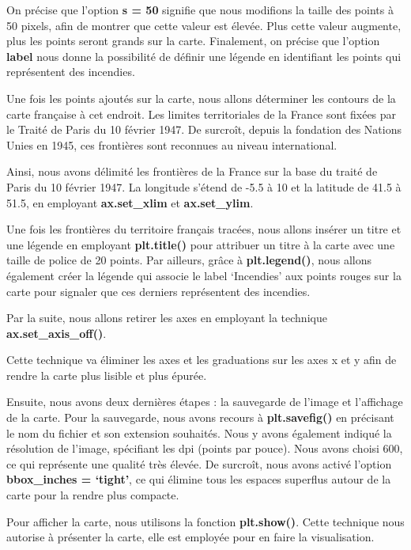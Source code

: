 \documentclass[
]{article}
\begin{document}
On précise que l'option \textbf{s = 50} signifie que nous modifions la
taille des points à 50 pixels, afin de montrer que cette valeur est
élevée. Plus cette valeur augmente, plus les points seront grands sur la
carte. Finalement, on précise que l'option \textbf{label} nous donne la
possibilité de définir une légende en identifiant les points qui
représentent des incendies.

Une fois les points ajoutés sur la carte, nous allons déterminer les
contours de la carte française à cet endroit. Les limites territoriales
de la France sont fixées par le Traité de Paris du 10 février 1947. De
surcroît, depuis la fondation des Nations Unies en 1945, ces frontières
sont reconnues au niveau international.

Ainsi, nous avons délimité les frontières de la France sur la base du
traité de Paris du 10 février 1947. La longitude s'étend de -5.5 à 10 et
la latitude de 41.5 à 51.5, en employant \textbf{ax.set\_xlim} et
\textbf{ax.set\_ylim}.

Une fois les frontières du territoire français tracées, nous allons
insérer un titre et une légende en employant \textbf{plt.title()} pour
attribuer un titre à la carte avec une taille de police de 20 points.
Par ailleurs, grâce à \textbf{plt.legend()}, nous allons également créer
la légende qui associe le label `Incendies' aux points rouges sur la
carte pour signaler que ces derniers représentent des incendies.

Par la suite, nous allons retirer les axes en employant la technique
\textbf{ax.set\_axis\_off()}.

Cette technique va éliminer les axes et les graduations sur les axes x
et y afin de rendre la carte plus lisible et plus épurée.

Ensuite, nous avons deux dernières étapes : la sauvegarde de l'image et
l'affichage de la carte. Pour la sauvegarde, nous avons recours à
\textbf{plt.savefig()} en précisant le nom du fichier et son extension
souhaités. Nous y avons également indiqué la résolution de l'image,
spécifiant les dpi (points par pouce). Nous avons choisi 600, ce qui
représente une qualité très élevée. De surcroît, nous avons activé
l'option \textbf{bbox\_inches = `tight'}, ce qui élimine tous les
espaces superflus autour de la carte pour la rendre plus compacte.

Pour afficher la carte, nous utilisons la fonction \textbf{plt.show()}.
Cette technique nous autorise à présenter la carte, elle est employée
pour en faire la visualisation.
\end{document}
